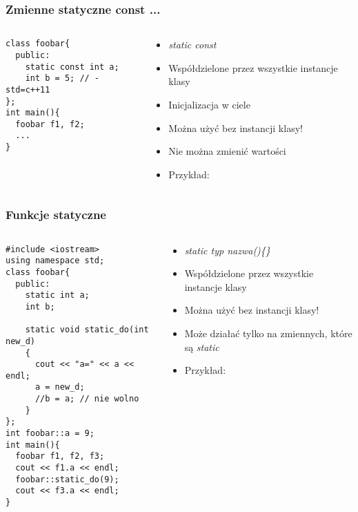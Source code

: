 \documentclass[10pt]{beamer}
\begin{document}
\begin{frame}[fragile]
  \frametitle{Zmienne statyczne const ...}
  \begin{columns}
    \begin{column}{0.48\textwidth}
\vspace{-0.2cm}
\begin{lstlisting}
class foobar{
  public:
    static const int a;
    int b = 5; // -std=c++11
};
int main(){
  foobar f1, f2;
  ...
}
\end{lstlisting}
    \end{column}
    \begin{column}{0.48\textwidth}
      \begin{itemize}
        \item \textit{static const}
        \item Współdzielone przez wszystkie instancje klasy
        \item Inicjalizacja w ciele
        \item Można użyć bez instancji klasy!
        \item Nie można zmienić wartości
        \item Przykład:
      \end{itemize}
    \end{column}
  \end{columns}
\end{frame}

\begin{frame}[fragile]
  \frametitle{Funkcje statyczne}
  \begin{columns}
    \begin{column}{0.48\textwidth}
\vspace{-0.2cm}
\begin{lstlisting}
#include <iostream>
using namespace std;
class foobar{
  public:
    static int a;
    int b;
    
    static void static_do(int new_d)
    {
      cout << "a=" << a << endl;
      a = new_d;
      //b = a; // nie wolno
    }
};
int foobar::a = 9;
int main(){
  foobar f1, f2, f3;
  cout << f1.a << endl;
  foobar::static_do(9);
  cout << f3.a << endl;
}
\end{lstlisting}
    \end{column}
    \begin{column}{0.48\textwidth}
      \begin{itemize}
        \item \textit{static typ nazwa()\{\}}
        \item Współdzielone przez wszystkie instancje klasy
        \item Można użyć bez instancji klasy!
        \item Może działać tylko na zmiennych, które są \textit{static}
        \item Przykład:
      \end{itemize}
    \end{column}
  \end{columns}
\end{frame}
\end{document}
